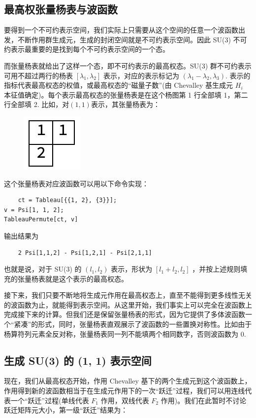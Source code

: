 \documentclass[UTF8]{ctexart}
\begin{document}
\subsection*{最高权张量杨表与波函数}
\noindent 要得到一个不可约表示空间，我们实际上只需要从这个空间的任意一个波函数出发，不断作用群生成元，生成的封闭空间就是不可约表示空间。因此 SU(3) 不可约表示最重要的是找到每个不可约表示空间的一个态。

而张量杨表就给出了这样一个态，即不可约表示的最高权态。SU(3) 群不可约表示可用不超过两行的杨表 $[\lambda_1, \lambda_2]$ 表示，对应的表示标记为 $(\lambda_1-\lambda_2,\lambda_3)$. 表示的指标代表最高权态的权值，或最高权态的“磁量子数”(由 Chevalley 基生成元 $H_i$ 本征值确定)。每个表示最高权态的张量杨表是在这个杨图第 1 行全部填 1，第二行全部填 2. 比如，对$(1,1)$表示，其张量杨表为：

\begin{figure}[H]
\begin{centering}
\includegraphics[width=0.1\linewidth]{include/Y1}
\par\end{centering}
\end{figure}

\noindent 这个张量杨表对应波函数可以用以下命令实现：
\begin{verbatim}
	ct = Tableau[{{1, 2}, {3}}];
v = Psi[1, 1, 2];
TableauPermute[ct, v]
\end{verbatim}
输出结果为
\begin{verbatim}
	2 Psi[1,1,2] - Psi[1,2,1] - Psi[2,1,1]
\end{verbatim}
也就是说，对于 SU(3) 的 $(l_1,l_2)$ 表示，形状为 $[l_1+l_2,l_2]$ ，并按上述规则填充的张量杨表就是这个表示的最高权态。

接下来，我们只要不断地将生成元作用在最高权态上，直至不能得到更多线性无关的波函数为止，就能得到表示空间。从这里开始，我们事实上可以完全在波函数上完成接下来的计算。但我们还是保留张量杨表的形式，因为它提供了多体波函数一个“紧凑”的形式，同时，张量杨表直观展示了波函数的一些置换对称性。比如由于杨算符列元素全反对称，张量杨表同一列不能填两个相同数字，否则波函数为 0.

\subsection*{生成 SU(3) 的 (1, 1) 表示空间}
\noindent 现在，我们从最高权态开始，作用 Chevalley 基下的两个生成元到这个波函数上，作用得到新的波函数相当于在生成元作用下的一次“跃迁”过程，我们可以用连线代表一个“跃迁”过程(单线代表 $F_1$ 作用，双线代表 $F_2$ 作用)。我们在此暂时不讨论跃迁矩阵元大小，第一级“跃迁”结果为：
\end{document}
